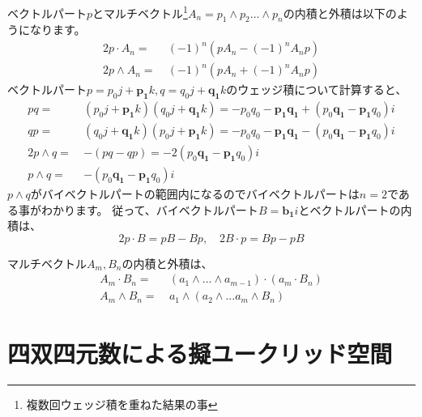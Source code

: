 \documentclass[a4paper,12pt,notitlepage]{jsreport}
\begin{document}
ベクトルパート$p$とマルチベクトル\footnote{複数回ウェッジ積を重ねた結果の事}$A_n=p_1\wedge p_2...\wedge p_n$の内積と外積は以下のようになります。
\begin{equation}
  \begin{split}
    2p\cdot A_n=~&(-1)^n(pA_n-(-1)^nA_np)\\
    2p\wedge A_n=~&(-1)^n(pA_n+(-1)^nA_np)
  \end{split}
\end{equation}
ベクトルパート$p=p_0j+\bm{p_1}k,q=q_0j+\bm{q_1}k$のウェッジ積について計算すると、
\begin{equation}
  \begin{split}
    pq=~&(p_0j+\bm{p_1}k)(q_0j+\bm{q_1}k)=-p_0q_0-\bm{p_1}\bm{q_1}+(p_0\bm{q_1}-\bm{p_1}q_0)i\\
    qp=~&(q_0j+\bm{q_1}k)(p_0j+\bm{p_1}k)=-p_0q_0-\bm{p_1}\bm{q_1}-(p_0\bm{q_1}-\bm{p_1}q_0)i\\
    2p\wedge q=~&-(pq-qp)=-2(p_0\bm{q_1}-\bm{p_1}q_0)i\\
    p\wedge q=~&-(p_0\bm{q_1}-\bm{p_1}q_0)i
  \end{split}
\end{equation}
$p\wedge q$がバイベクトルパートの範囲内になるのでバイベクトルパートは$n=2$である事がわかります。
従って、バイベクトルパート$B=\bm{b_1}i$とベクトルパートの内積は、
\begin{equation}
  2p\cdot B=pB-Bp,\quad 2B\cdot p=Bp-pB
\end{equation}

マルチベクトル$A_m,B_n$の内積と外積は、
\begin{equation}
  \begin{split}
    A_m\cdot B_n=~&(a_1\wedge ...\wedge a_{m-1})\cdot(a_m\cdot B_n)\\
    A_m\wedge B_n=~&a_1\wedge(a_2\wedge ...a_m\wedge B_n)
  \end{split}
\end{equation}

\section{四双四元数による擬ユークリッド空間}
\end{document}
